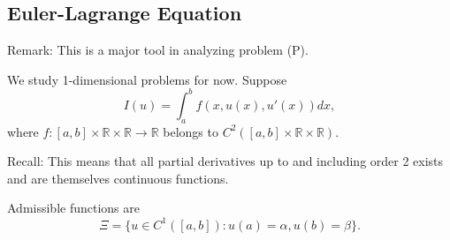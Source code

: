 \documentclass[12pt]{report}
\begin{document}
\subsection{Euler-Lagrange Equation}
Remark: This is a major tool in analyzing problem (P). 

We study 1-dimensional problems for now. Suppose \[I(u) = \int_a^b f(x, u(x), u'(x)) dx,\]where \(f:[a, b] \times \mathbb{R} \times \mathbb{R} \to \mathbb{R}\) belongs to \(C^2([a, b] \times \mathbb{R} \times \mathbb{R})\). 

Recall: This means that all partial derivatives up to and including order 2 exists and are themselves continuous functions. 

Admissible functions are
\begin{equation}
    \Xi = \{ u \in C^1([a,b]) : u(a) = \alpha, u(b) = \beta \}.
\end{equation}
\end{document}
